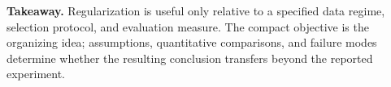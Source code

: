 \documentclass[10pt,letterpaper,twocolumn]{article}
\renewcommand{\section}[1]{\vspace{2pt}\textbf{#1.}\hspace{0.30em}}
\begin{document}
\section{Takeaway}
Regularization is useful only relative to a specified data regime, selection protocol, and evaluation measure. The compact objective is the organizing idea; assumptions, quantitative comparisons, and failure modes determine whether the resulting conclusion transfers beyond the reported experiment.
\end{document}
